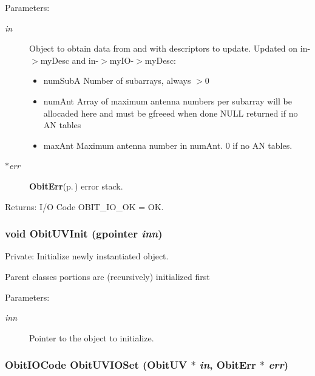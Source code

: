 \begin{Desc}
\item[Parameters:]
\begin{description}
\item[{\em in}]Object to obtain data from and with descriptors to update. Updated on in-$>$my\-Desc and in-$>$my\-IO-$>$my\-Desc: \begin{itemize}
\item num\-Sub\-A Number of subarrays, always $>$0 \item num\-Ant Array of maximum antenna numbers per subarray will be allocaded here and must be gfreeed when done NULL returned if no AN tables \item max\-Ant Maximum antenna number in num\-Ant. 0 if no AN tables. \end{itemize}
\item[{\em $\ast$err}]{\bf Obit\-Err}{\rm (p.\,\pageref{structObitErr})} error stack. \end{description}
\end{Desc}
\begin{Desc}
\item[Returns:]I/O Code OBIT\_\-IO\_\-OK = OK. \end{Desc}
\subsubsection{\setlength{\rightskip}{0pt plus 5cm}void Obit\-UVInit (gpointer {\em inn})}\label{ObitUV_8c_a3}


Private: Initialize newly instantiated object. 

Parent classes portions are (recursively) initialized first \begin{Desc}
\item[Parameters:]
\begin{description}
\item[{\em inn}]Pointer to the object to initialize. \end{description}
\end{Desc}
\subsubsection{\setlength{\rightskip}{0pt plus 5cm}Obit\-IOCode Obit\-UVIOSet ({\bf Obit\-UV} $\ast$ {\em in}, {\bf Obit\-Err} $\ast$ {\em err})}\label{ObitUV_8c_a36}


